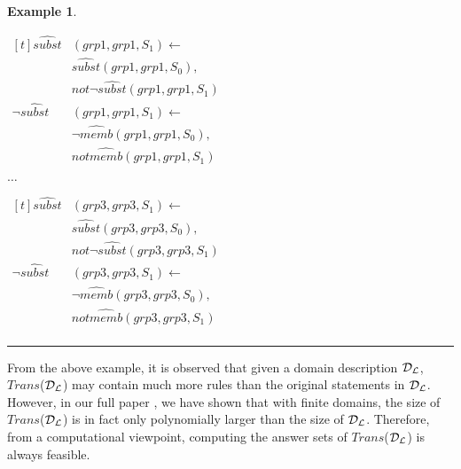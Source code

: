 \documentclass[11pt, twocolumn]{article}
\newtheorem{vexmpl}{Example}
\newenvironment{vexample}
  {\begin{vexmpl}\rm}
  {\rule{2mm}{2mm}\end{vexmpl}}
\begin{document}
\begin{vexample}
\begin{enumerate}
              \begin{math}
                \begin{aligned}[t]
                  \hat{subst}&(grp1, grp1, S_{1}) \leftarrow \\
                  & \hat{subst}(grp1, grp1, S_{0}), \\
                  & not \lnot \hat{subst}(grp1, grp1, S_{1}) \\
                  \lnot \hat{subst}&(grp1, grp1, S_{1}) \leftarrow \\
                  & \lnot \hat{memb}(grp1, grp1, S_{0}), \\
                  & not \hat{memb}(grp1, grp1, S_{1})
                \end{aligned}
              \end{math}

              \hspace{1cm} $\ldots$

              \begin{math}
                \begin{aligned}[t]
                  \hat{subst}&(grp3, grp3, S_{1}) \leftarrow \\
                  & \hat{subst}(grp3, grp3, S_{0}), \\
                  & not \lnot \hat{subst}(grp3, grp3, S_{1}) \\
                  \lnot \hat{subst}&(grp3, grp3, S_{1}) \leftarrow \\
                  & \lnot \hat{memb}(grp3, grp3, S_{0}), \\
                  & not \hat{memb}(grp3, grp3, S_{1}) \\
                \end{aligned}
              \end{math}
          \end{enumerate}
        \end{vexample}

        From the above example, it is observed that given a domain description
        ${\cal D_{L}}$, $Trans$(${\cal D_{L}}$) may contain much more rules
        than the original statements in ${\cal D_{L}}$. However, in our full
        paper \cite{CRE}, we have shown that with finite domains, the size of
        $Trans$(${\cal D_{L}}$) is in fact only polynomially larger than the
        size of ${\cal D_{L}}$. Therefore, from a computational viewpoint,
        computing the answer sets of $Trans$(${\cal D_{L}}$) is always
        feasible.
\end{document}
